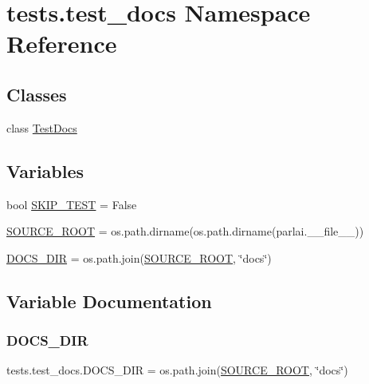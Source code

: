 \hypertarget{namespacetests_1_1test__docs}{}\section{tests.\+test\+\_\+docs Namespace Reference}
\label{namespacetests_1_1test__docs}
\subsection*{Classes}
\begin{DoxyCompactItemize}
\item 
class \hyperlink{classtests_1_1test__docs_1_1TestDocs}{Test\+Docs}
\end{DoxyCompactItemize}
\subsection*{Variables}
\begin{DoxyCompactItemize}
\item 
bool \hyperlink{namespacetests_1_1test__docs_a108de87d5d7455e720b4e6bdd3ac9257}{S\+K\+I\+P\+\_\+\+T\+E\+ST} = False
\item 
\hyperlink{namespacetests_1_1test__docs_a2ede9a57e3255e9217c239edda5271b6}{S\+O\+U\+R\+C\+E\+\_\+\+R\+O\+OT} = os.\+path.\+dirname(os.\+path.\+dirname(parlai.\+\_\+\+\_\+file\+\_\+\+\_\+))
\item 
\hyperlink{namespacetests_1_1test__docs_aa63f964d4d882c6489439dcfd69daf54}{D\+O\+C\+S\+\_\+\+D\+IR} = os.\+path.\+join(\hyperlink{namespacetests_1_1test__docs_a2ede9a57e3255e9217c239edda5271b6}{S\+O\+U\+R\+C\+E\+\_\+\+R\+O\+OT}, \char`\"{}docs\char`\"{})
\end{DoxyCompactItemize}


\subsection{Variable Documentation}
\mbox{\label{namespacetests_1_1test__docs_aa63f964d4d882c6489439dcfd69daf54}} 
\subsubsection{\texorpdfstring{D\+O\+C\+S\+\_\+\+D\+IR}{DOCS\_DIR}}
{\footnotesize\ttfamily tests.\+test\+\_\+docs.\+D\+O\+C\+S\+\_\+\+D\+IR = os.\+path.\+join(\hyperlink{namespacetests_1_1test__docs_a2ede9a57e3255e9217c239edda5271b6}{S\+O\+U\+R\+C\+E\+\_\+\+R\+O\+OT}, \char`\"{}docs\char`\"{})}



